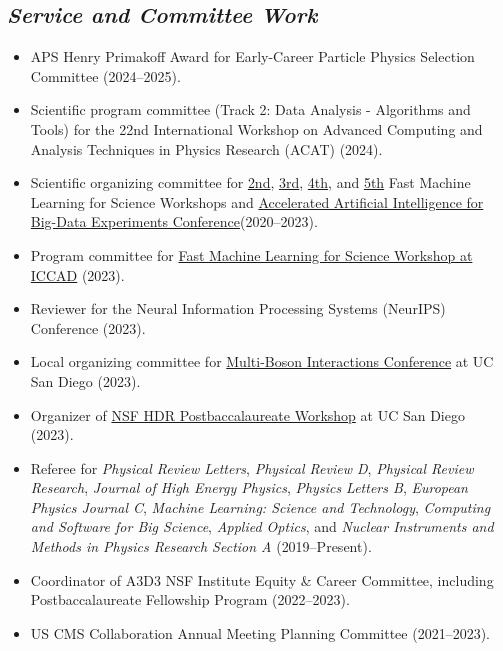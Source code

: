 \documentclass[11pt]{res}
\newcommand{\MarginText}[1]{\section{\textit{#1}}}
\begin{document}
\begin{resume}

  \MarginText{Service and Committee Work}

  \begin{itemize}
    \itemsep-0.3em
    \item APS Henry Primakoff Award for Early-Career Particle Physics Selection Committee (2024--2025).
    \item Scientific program committee (Track 2: Data Analysis - Algorithms and Tools) for the 22nd International Workshop on Advanced Computing and Analysis Techniques in Physics Research (ACAT) (2024).
    \item Scientific organizing committee for \href{https://indico.cern.ch/e/fml2020}{2nd}, \href{https://indico.cern.ch/e/fml2022}{3rd}, \href{https://indico.cern.ch/e/fastml2023}{4th}, and \href{https://indico.cern.ch/e/fastml2024}{5th} Fast Machine Learning for Science Workshops and \href{http://www.ncsa.illinois.edu/Conferences/AcceleratedAINCSA/}{Accelerated Artificial Intelligence for Big-Data Experiments Conference}({2020--2023}).
    \item Program committee for \href{https://fastmachinelearning.org/iccad2023/}{Fast Machine Learning for Science Workshop at ICCAD} (2023).
    \item Reviewer for the Neural Information Processing Systems (NeurIPS) Conference ({2023}).
    \item Local organizing committee for \href{https://indico.cern.ch/e/mbi2023}{Multi-Boson Interactions Conference} at UC San Diego (2023).
    \item Organizer of \href{https://indico.cern.ch/e/hdrpostbac2023}{NSF HDR Postbaccalaureate Workshop} at UC San Diego (2023).
    \item Referee for \emph{Physical Review Letters}, \emph{Physical Review D}, \emph{Physical Review Research}, \emph{Journal of High Energy Physics}, \emph{Physics Letters B}, \emph{European Physics Journal C}, \emph{Machine Learning: Science and Technology}, \emph{Computing and Software for Big Science}, \emph{Applied Optics}, and \emph{Nuclear Instruments and Methods in Physics Research Section A} ({2019--Present}).
    \item Coordinator of A3D3 NSF Institute Equity \& Career Committee, including Postbaccalaureate Fellowship Program ({2022--2023}).
    \item US CMS Collaboration Annual Meeting Planning Committee ({2021--2023}).

\end{itemize}
\end{resume}
\end{document}
